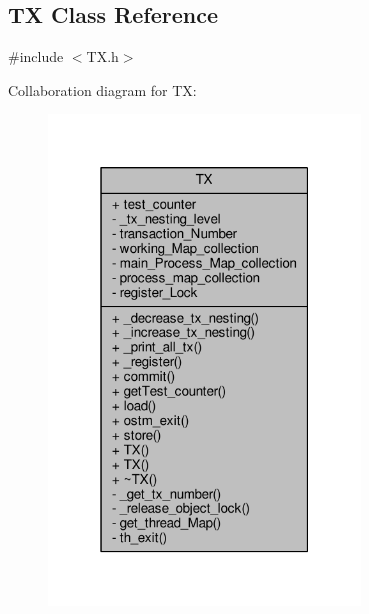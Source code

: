 \hypertarget{class_t_x}{}\subsection{TX Class Reference}
\label{class_t_x}


{\ttfamily \#include $<$T\+X.\+h$>$}



Collaboration diagram for TX\+:\nopagebreak
\begin{figure}[H]
\begin{center}
\leavevmode
\includegraphics[width=235pt]{class_t_x__coll__graph}
\end{center}
\end{figure}
